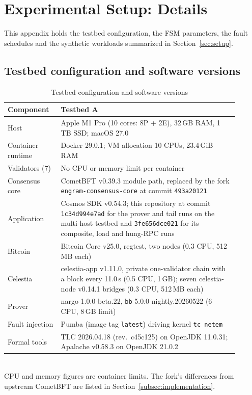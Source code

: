 \section{Experimental Setup: Details}
\label{app:setup}

This appendix holds the testbed configuration, the FSM parameters, the fault schedules and the synthetic workloads summarized in Section~\ref{sec:setup}.

\subsection*{Testbed configuration and software versions}

\begin{table}[H]
\caption{Testbed configuration and software versions}
\label{tab:environment}
\centering
\footnotesize
\begin{tabular}{@{}p{0.2\linewidth}p{0.7\linewidth}@{}}
\toprule
\textbf{Component} & \textbf{Testbed A} \\
\midrule
Host & Apple M1 Pro (10 cores: 8P + 2E), 32\,GB RAM, 1\,TB SSD; macOS 27.0 \\
Container runtime & Docker 29.0.1; VM allocation 10 CPUs, 23.4\,GiB RAM \\
Validators (7) & No CPU or memory limit per container \\
Consensus core & CometBFT v0.39.3 module path, replaced by the fork
\texttt{engram-consensus-core} at commit \texttt{493a20121} \\
Application & Cosmos SDK v0.54.3; this repository at commit \texttt{1c34d994e7ad} for the prover and tail runs on the multi-host testbed and \texttt{3fe656dce021} for its composite, load and hung-RPC runs \\
Bitcoin & Bitcoin Core v25.0, regtest, two nodes (0.3 CPU, 512\,MB each) \\
Celestia & celestia-app v1.11.0, private one-validator chain with a block every 11.0\,s (0.5 CPU, 1\,GB); seven celestia-node
v0.14.1 bridges (0.3 CPU, 512\,MB each) \\
Prover & nargo 1.0.0-beta.22, \texttt{bb} 5.0.0-nightly.20260522
(6 CPU, 8\,GB limit) \\
Fault injection & Pumba (image tag \texttt{latest}) driving kernel
\texttt{tc netem} \\
Formal tools & TLC 2026.04.18 (rev.\ c45c125) on OpenJDK 11.0.31; Apalache v0.58.3 on OpenJDK 21.0.2 \\
\bottomrule
\end{tabular}
\\[2pt]
\footnotesize CPU and memory figures are container limits. The fork's
differences from upstream CometBFT are listed in
Section~\ref{subsec:implementation}.
\end{table}

